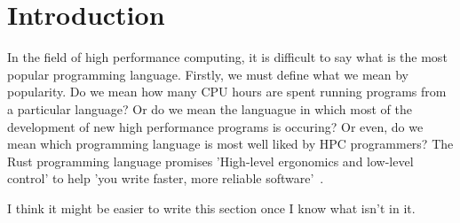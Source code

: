 \chapter{Introduction}
In the field of high performance computing, it is difficult to say what is the most popular programming language. Firstly, we must define what we mean by popularity. Do we mean how many CPU hours are spent running programs from a particular language? Or do we mean the languague in which most of the development of new high performance programs is occuring? Or even, do we mean which programming language is most well liked by HPC programmers?
The Rust programming language promises 'High-level ergonomics and low-level control' to help 'you write faster, more reliable software'~\cite{RustBook}.

I think it might be easier to write this section once I know what isn't in it.
